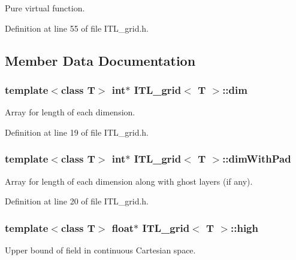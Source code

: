 Pure virtual function. 



Definition at line 55 of file ITL\_\-grid.h.



\subsection{Member Data Documentation}
\hypertarget{classITL__grid_a90ea972d6b2a9ce6e895bde21943e75d}{
\subsubsection[{dim}]{\setlength{\rightskip}{0pt plus 5cm}template$<$class T$>$ int$\ast$ {\bf ITL\_\-grid}$<$ T $>$::{\bf dim}}}
\label{classITL__grid_a90ea972d6b2a9ce6e895bde21943e75d}


Array for length of each dimension. 



Definition at line 19 of file ITL\_\-grid.h.

\hypertarget{classITL__grid_aa5c2e652215db2cbba916fdaab3e0bfb}{
\subsubsection[{dimWithPad}]{\setlength{\rightskip}{0pt plus 5cm}template$<$class T$>$ int$\ast$ {\bf ITL\_\-grid}$<$ T $>$::{\bf dimWithPad}}}
\label{classITL__grid_aa5c2e652215db2cbba916fdaab3e0bfb}


Array for length of each dimension along with ghost layers (if any). 



Definition at line 20 of file ITL\_\-grid.h.

\hypertarget{classITL__grid_a14b5be78196bb74d85cf3751a2b32b47}{
\subsubsection[{high}]{\setlength{\rightskip}{0pt plus 5cm}template$<$class T$>$ float$\ast$ {\bf ITL\_\-grid}$<$ T $>$::{\bf high}}}
\label{classITL__grid_a14b5be78196bb74d85cf3751a2b32b47}


Upper bound of field in continuous Cartesian space. 

